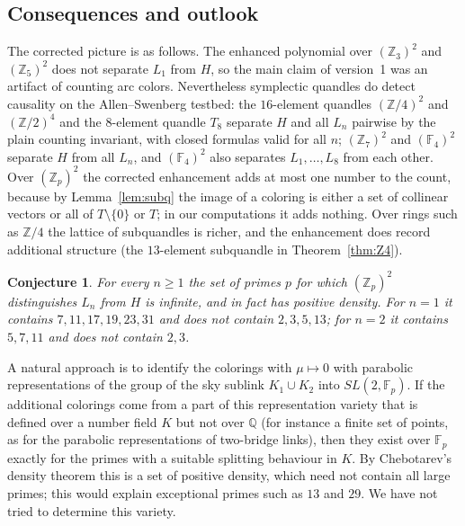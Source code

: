 \documentclass[11pt]{article}
\newtheorem{conjecture}[theorem]{Conjecture}
\theoremstyle{definition}
\newcommand{\Z}{\mathbb{Z}}
\newcommand{\F}{\mathbb{F}}
\newcommand{\Q}{\mathbb{Q}}
\begin{document}
\subsection{Consequences and outlook}\label{ssec:outlook}

The corrected picture is as follows. The enhanced polynomial over $(\Z_3)^2$ and $(\Z_5)^2$ does not
separate $L_1$ from $H$, so the main claim of version~1 was an artifact of counting arc colors. Nevertheless
symplectic quandles do detect causality on the Allen--Swenberg testbed: the $16$-element quandles
$(\Z/4)^2$ and $(\Z/2)^4$ and the $8$-element quandle $T_8$ separate $H$ and all $L_n$ pairwise by the plain
counting invariant, with closed formulas valid for all $n$; $(\Z_7)^2$ and $(\F_4)^2$ separate $H$ from all
$L_n$, and $(\F_4)^2$ also separates $L_1,\dots,L_8$ from each other.
Over $(\Z_p)^2$ the corrected enhancement adds at most one number to the count, because by
Lemma~\ref{lem:subq} the image of a coloring is either a set of collinear vectors or all of $T\setminus\{0\}$
or $T$; in our computations it adds nothing. Over rings such as $\Z/4$ the lattice of subquandles is richer, and the enhancement does record
additional structure (the $13$-element subquandle in Theorem~\ref{thm:Z4}).

\begin{conjecture}\label{conj:primes}
For every $n\ge1$ the set of primes $p$ for which $(\Z_p)^2$ distinguishes $L_n$ from $H$ is infinite, and
in fact has positive density. For $n=1$ it contains $7,11,17,19,23,31$ and does not contain
$2,3,5,13$; for $n=2$ it contains $5,7,11$ and does not contain $2,3$.
\end{conjecture}

A natural approach is to identify the colorings with $\mu\mapsto0$ with parabolic representations of
the group of the sky sublink $K_1\cup K_2$ into $SL(2,\F_p)$. If the additional colorings come from a part of
this representation variety that is defined over a number field $K$ but not over $\Q$ (for instance a
finite set of points, as for the parabolic representations of two-bridge links), then they exist over
$\F_p$ exactly for the primes with a suitable splitting behaviour in $K$. By Chebotarev's density theorem
this is a set of positive density, which need not contain all large primes; this would explain exceptional
primes such as $13$ and $29$. We have not tried to determine this variety.
\end{document}
